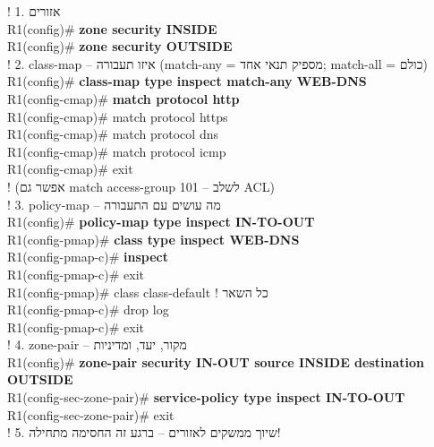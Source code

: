 \documentclass[11pt]{article}
\newcommand{\enLR}[1]{\textenglish{#1}}
\begin{document}
\begin{codebox}\begin{english}\codefont\footnotesize\color{cfg}\setlength{\parindent}{0pt}
\textcolor{ccom}{\texthebrew{! \enLR{1.} אזורים}}\\
R1(config)\# \textcolor{cbold}{\textbf{zone security INSIDE}}\\
R1(config)\# \textcolor{cbold}{\textbf{zone security OUTSIDE}}\\
\textcolor{ccom}{\texthebrew{! \enLR{2. class-map} – איזו תעבורה \enLR{(match-any} = מספיק תנאי אחד; \enLR{match-all} = כולם)}}\\
R1(config)\# \textcolor{cbold}{\textbf{class-map type inspect match-any WEB-DNS}}\\
R1(config-cmap)\# \textcolor{cbold}{\textbf{match protocol http}}\\
R1(config-cmap)\# match protocol https\\
R1(config-cmap)\# match protocol dns\\
R1(config-cmap)\# match protocol icmp\\
R1(config-cmap)\# exit\\
\textcolor{ccom}{\texthebrew{! (אפשר גם \enLR{match access-group 101} – לשלב \enLR{ACL)}}}\\
\textcolor{ccom}{\texthebrew{! \enLR{3. policy-map} – מה עושים עם התעבורה}}\\
R1(config)\# \textcolor{cbold}{\textbf{policy-map type inspect IN-TO-OUT}}\\
R1(config-pmap)\# \textcolor{cbold}{\textbf{class type inspect WEB-DNS}}\\
R1(config-pmap-c)\# \textcolor{cbold}{\textbf{inspect}}\\
R1(config-pmap-c)\# exit\\
R1(config-pmap)\# class class-default          \textcolor{ccom}{\texthebrew{! כל השאר}}\\
R1(config-pmap-c)\# drop log\\
R1(config-pmap-c)\# exit\\
\textcolor{ccom}{\texthebrew{! \enLR{4. zone-pair} – מקור, יעד, ומדיניות}}\\
R1(config)\# \textcolor{cbold}{\textbf{zone-pair security IN-OUT source INSIDE destination OUTSIDE}}\\
R1(config-sec-zone-pair)\# \textcolor{cbold}{\textbf{service-policy type inspect IN-TO-OUT}}\\
R1(config-sec-zone-pair)\# exit\\
\textcolor{ccom}{\texthebrew{! \enLR{5.} שיוך ממשקים לאזורים – ברגע זה החסימה מתחילה!}}\\

\end{english}
\end{codebox}
\end{document}
